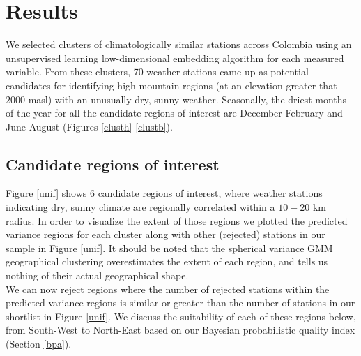 \documentclass[a4paper,fleqn,usenatbib]{mnras}
\begin{document}
\section{Results}

We selected clusters of climatologically similar stations across Colombia using an unsupervised learning low-dimensional embedding algorithm for each measured variable. From these clusters, 70 weather stations came up as potential candidates for identifying high-mountain regions (at an elevation greater that 2000 masl) with an unusually dry, sunny weather. Seasonally, the driest months of the year for all the candidate regions of interest are December-February and June-August (Figures \ref{clusth}-\ref{clustb}). 

\subsection{Candidate regions of interest}

Figure \ref{unif} shows 6 candidate regions of interest, where weather stations indicating dry, sunny climate are regionally correlated within a $10-20$ km radius. In order to visualize the extent of those regions we plotted the predicted variance regions for each cluster along with other (rejected) stations in our sample in Figure \ref{unif}. It should be noted that the spherical variance GMM geographical clustering overestimates the extent of each region, and tells us nothing of their actual geographical shape. \\

We can now reject regions where the number of rejected stations within the predicted variance regions is similar or greater than the number of stations in our shortlist in Figure \ref{unif}.  We discuss the suitability of each of these regions below, from South-West to North-East based on our Bayesian probabilistic quality index (Section \ref{bpa}).
\end{document}
